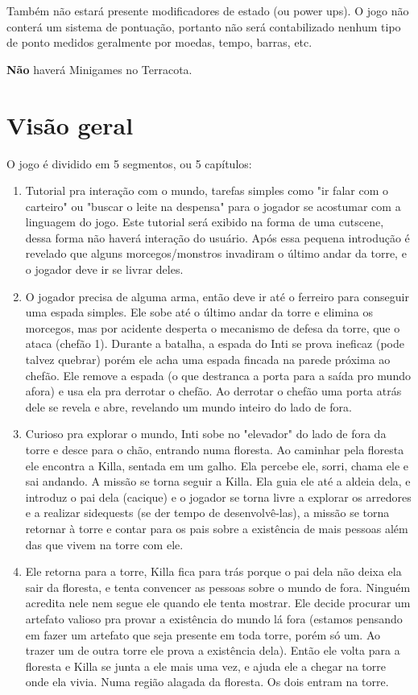 \documentclass[12pt]{article}
\begin{document}
Também não estará presente modificadores de estado (ou power ups). O jogo não
conterá um sistema de pontuação, portanto não será contabilizado nenhum tipo
de ponto medidos geralmente por moedas, tempo, barras, etc.

{\bf Não} haverá Minigames no Terracota.

\section{Visão geral}
O jogo é dividido em 5 segmentos, ou 5 capítulos:
\begin{enumerate}
\item Tutorial pra interação com o mundo, tarefas simples como "ir falar com o
carteiro" ou "buscar o leite na despensa" para o jogador se acostumar com a
linguagem do jogo. Este tutorial será exibido na forma de uma cutscene, dessa
forma não haverá interação do usuário.
Após essa pequena introdução é revelado que alguns morcegos/monstros invadiram
o último andar da torre, e o jogador deve ir se livrar deles.

\item O jogador precisa de alguma arma, então deve ir até o ferreiro para
conseguir uma espada simples. Ele sobe até o último andar da torre e elimina os
morcegos, mas por acidente desperta o mecanismo de defesa da torre, que o ataca
(chefão 1).
Durante a batalha, a espada do Inti se prova ineficaz (pode talvez quebrar)
porém ele acha uma espada fincada na parede próxima ao chefão. Ele remove a
espada (o que destranca a porta para a saída pro mundo afora) e usa ela pra
derrotar o chefão.
Ao derrotar o chefão uma porta atrás dele se revela e abre, revelando um mundo
inteiro do lado de fora.

\item Curioso pra explorar o mundo, Inti sobe no "elevador" do lado de fora da
torre e desce para o chão, entrando numa floresta.
Ao caminhar pela floresta ele encontra a Killa, sentada em um galho. Ela percebe
ele, sorri, chama ele e sai andando. A missão se torna seguir a Killa.
Ela guia ele até a aldeia dela, e introduz o pai dela (cacique) e o jogador se
torna livre a explorar os arredores e a realizar sidequests (se der tempo de
desenvolvê-las), a missão se torna retornar à torre e contar para os pais sobre
a existência de mais pessoas além das que vivem na torre com ele.

\item Ele retorna para a torre, Killa fica para trás porque o pai dela não deixa
ela sair da floresta, e tenta convencer as pessoas sobre o mundo de fora. Ninguém
acredita nele nem segue ele quando ele tenta mostrar. Ele decide procurar um
artefato valioso pra provar a existência do mundo lá fora (estamos pensando em
fazer um artefato que seja presente em toda torre, porém só um. Ao trazer um de
outra torre ele prova a existência dela).
Então ele volta para a floresta e Killa se junta a ele mais uma vez, e ajuda ele
a chegar na torre onde ela vivia. Numa região alagada da floresta. Os dois
entram na torre.


\end{enumerate}
\end{document}
